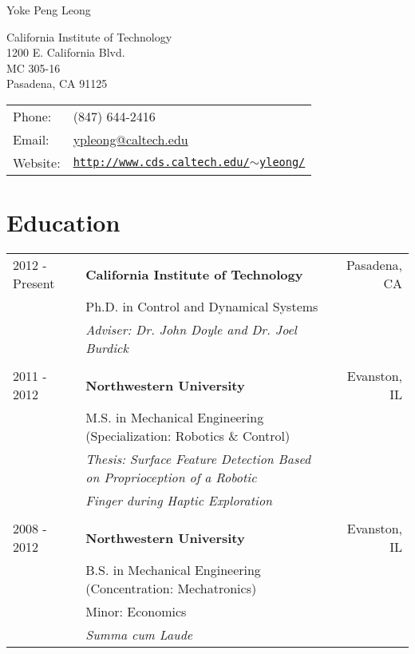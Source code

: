 \documentclass[letterpaper]{article}
\def\name{Yoke Peng Leong}
\begin{document}
{\huge \name}

\hrulefill
\vspace{10px}


\begin{minipage}{0.45\linewidth}
  California Institute of Technology\\
  1200 E. California Blvd.\\
  MC 305-16 \\ 
  Pasadena, CA 91125
\end{minipage}
\begin{minipage}{0.45\linewidth}
  \begin{tabular}{ll}
    Phone: &             (847) 644-2416     \\
    Email: & \href{mailto:ypleong@caltech.edu}{ypleong@caltech.edu} \\
    Website: & \href{http://www.cds.caltech.edu/~yleong/}{\tt http://www.cds.caltech.edu/$\sim$yleong/} 
  \end{tabular}
\end{minipage}

\section*{Education}

\begin{tabular*}{\textwidth}{@{\extracolsep{\fill}} l l r}
2012 - Present &\textbf{California Institute of Technology} & Pasadena, CA\\
 & Ph.D. in Control and Dynamical Systems & \\ 
 & \textit{Adviser: Dr. John Doyle and Dr. Joel Burdick} & \\ \\

2011 - 2012 &\textbf{Northwestern University} & Evanston, IL\\
 & M.S. in Mechanical Engineering (Specialization: Robotics \& Control) & \\
 & \textit{Thesis: Surface Feature Detection Based on Proprioception of a Robotic}&\\
& \textit{Finger during Haptic Exploration} & \\ \\

2008 - 2012 &\textbf{Northwestern University}& Evanston, IL\\
 & B.S. in Mechanical Engineering (Concentration: Mechatronics) & \\
&Minor: Economics & \\
& \textit{Summa cum Laude} &
\end{tabular*}
\end{document}
